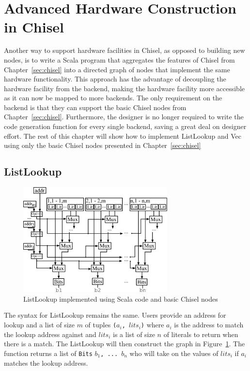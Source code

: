 \section{Advanced Hardware Construction in Chisel}
Another way to support hardware facilities in Chisel, as opposed to
building new nodes, is to write a Scala program that aggregates the
features of Chisel from Chapter~\ref{sec:chisel} into a directed graph
of nodes that implement the same hardware functionality. This approach
has the advantage of decoupling the hardware facility from the
backend, making the hardware facility more accessible as it can now be
mapped to more backends. The only requirement on the backend is that
they can support the basic Chisel nodes from
Chapter~\ref{sec:chisel}. Furthermore, the designer is no longer
required to write the code generation function for every single
backend, saving a great deal on designer effort. The rest of this
chapter will show how to implement ListLookup and Vec using only the
basic Chisel nodes presented in Chapter~\ref{sec:chisel}

\subsection{ListLookup}
\begin{figure}[htb]
\centering
\includegraphics[width=0.7\textwidth]{figures/listlookupscala.pdf}
\caption{ListLookup implemented using Scala code and basic Chisel nodes}
\label{fig:llscala}
\end{figure}

The syntax for ListLookup remains the same. Users provide an address
for lookup and a list of size $m$ of tuples {\tt ($a_i$, $lits_i$)}
where {\tt $a_i$} is the address to match the lookup address against and
{\tt $lits_i$} is a list of size $n$ of literals to return when there
is a match. The ListLookup will then construct the graph in
Figure~\ref{fig:llscala}. The function returns a list of {\tt Bits}
{\tt $b_1$, ... $b_n$} who will take on the values of {\tt $lits_i$} if
{\tt $a_i$} matches the lookup address.

